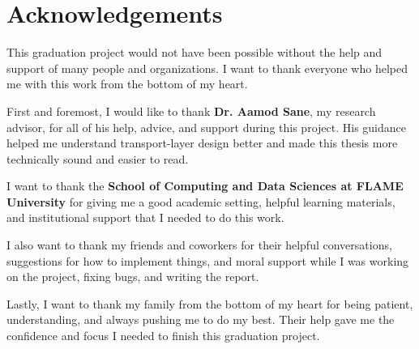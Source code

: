 \chapter{Acknowledgements}

This graduation project would not have been possible without the help and
support of many people and organizations. I want to thank everyone who helped
me with this work from the bottom of my heart.

First and foremost, I would like to thank \textbf{Dr. Aamod Sane}, my research
advisor, for all of his help, advice, and support during this project. His
guidance helped me understand transport-layer design better and made this
thesis more technically sound and easier to read.

I want to thank the \textbf{School of Computing and Data Sciences at FLAME
University} for giving me a good academic setting, helpful learning materials,
and institutional support that I needed to do this work.

I also want to thank my friends and coworkers for their helpful conversations,
suggestions for how to implement things, and moral support while I was working
on the project, fixing bugs, and writing the report.

Lastly, I want to thank my family from the bottom of my heart for being
patient, understanding, and always pushing me to do my best. Their help gave
me the confidence and focus I needed to finish this graduation project.